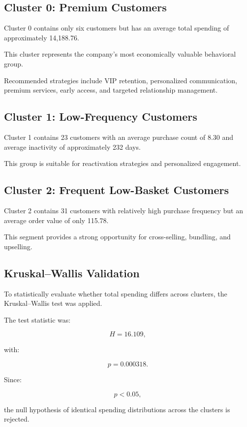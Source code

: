 \documentclass[11pt,a4paper]{article}
\begin{document}
\subsection{Cluster 0: Premium Customers}

Cluster 0 contains only six customers but has an average total spending of approximately 14,188.76.

This cluster represents the company's most economically valuable behavioral group.

Recommended strategies include VIP retention, personalized communication, premium services, early access, and targeted relationship management.

\subsection{Cluster 1: Low-Frequency Customers}

Cluster 1 contains 23 customers with an average purchase count of 8.30 and average inactivity of approximately 232 days.

This group is suitable for reactivation strategies and personalized engagement.

\subsection{Cluster 2: Frequent Low-Basket Customers}

Cluster 2 contains 31 customers with relatively high purchase frequency but an average order value of only 115.78.

This segment provides a strong opportunity for cross-selling, bundling, and upselling.

\subsection{Kruskal--Wallis Validation}

To statistically evaluate whether total spending differs across clusters, the Kruskal--Wallis test was applied.

The test statistic was:

\[
H=16.109,
\]

with:

\[
p=0.000318.
\]

Since:

\[
p<0.05,
\]

the null hypothesis of identical spending distributions across the clusters is rejected.
\end{document}
